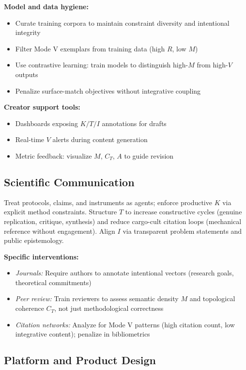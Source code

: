 \documentclass[12pt]{article}
\begin{document}
\textbf{Model and data hygiene:}
\begin{itemize}
\item Curate training corpora to maintain constraint diversity and intentional integrity
\item Filter Mode V exemplars from training data (high $R$, low $M$)
\item Use contrastive learning: train models to distinguish high-$M$ from high-$V$ outputs
\item Penalize surface-match objectives without integrative coupling
\end{itemize}

\textbf{Creator support tools:}
\begin{itemize}
\item Dashboards exposing $K/T/I$ annotations for drafts
\item Real-time $V$ alerts during content generation
\item Metric feedback: visualize $M$, $C_T$, $A$ to guide revision
\end{itemize}

\subsection{Scientific Communication}

Treat protocols, claims, and instruments as agents; enforce productive $K$ via explicit method constraints. Structure $T$ to increase constructive cycles (genuine replication, critique, synthesis) and reduce cargo-cult citation loops (mechanical reference without engagement). Align $I$ via transparent problem statements and public epistemology.

\textbf{Specific interventions:}
\begin{itemize}
\item \textit{Journals:} Require authors to annotate intentional vectors (research goals, theoretical commitments)
\item \textit{Peer review:} Train reviewers to assess semantic density $M$ and topological coherence $C_T$, not just methodological correctness
\item \textit{Citation networks:} Analyze for Mode V patterns (high citation count, low integrative content); penalize in bibliometrics
\end{itemize}

\subsection{Platform and Product Design}
\end{document}
